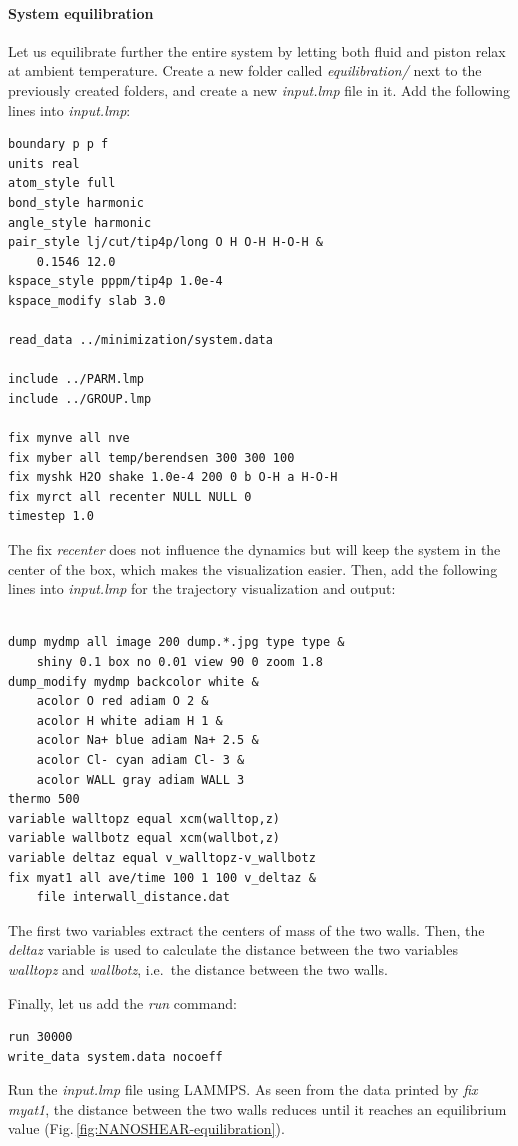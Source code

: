\documentclass[9pt,tutorial]{livecoms}
\begin{document}
\paragraph{System equilibration}
Let us equilibrate further the entire system by letting both fluid and piston
relax at ambient temperature. Create a new folder called \textit{equilibration/}
next to the previously created folders, and create a new \textit{input.lmp}
file in it. Add the following lines into \textit{input.lmp}:
\begin{lstlisting}
boundary p p f
units real
atom_style full
bond_style harmonic
angle_style harmonic
pair_style lj/cut/tip4p/long O H O-H H-O-H &
    0.1546 12.0
kspace_style pppm/tip4p 1.0e-4
kspace_modify slab 3.0

read_data ../minimization/system.data

include ../PARM.lmp
include ../GROUP.lmp

fix mynve all nve
fix myber all temp/berendsen 300 300 100
fix myshk H2O shake 1.0e-4 200 0 b O-H a H-O-H
fix myrct all recenter NULL NULL 0
timestep 1.0
\end{lstlisting}
The fix \textit{recenter} does not influence the dynamics but will keep the
system in the center of the box, which makes the
visualization easier. Then, add the following lines into \textit{input.lmp}
for the trajectory visualization and output:
\begin{lstlisting}

dump mydmp all image 200 dump.*.jpg type type &
    shiny 0.1 box no 0.01 view 90 0 zoom 1.8
dump_modify mydmp backcolor white &
    acolor O red adiam O 2 &
    acolor H white adiam H 1 &
    acolor Na+ blue adiam Na+ 2.5 &
    acolor Cl- cyan adiam Cl- 3 &
    acolor WALL gray adiam WALL 3
thermo 500
variable walltopz equal xcm(walltop,z)
variable wallbotz equal xcm(wallbot,z)
variable deltaz equal v_walltopz-v_wallbotz
fix myat1 all ave/time 100 1 100 v_deltaz &
    file interwall_distance.dat
\end{lstlisting}
The first two variables extract the centers of mass of the two walls. Then,
the \textit{deltaz} variable is used to calculate the distance between the two
variables \textit{walltopz} and \textit{wallbotz}, i.e.~the distance between the two walls.

Finally, let us add the \textit{run} command:
\begin{lstlisting}
run 30000
write_data system.data nocoeff
\end{lstlisting}
Run the \textit{input.lmp} file using LAMMPS. As seen from the data printed by
\textit{fix myat1}, the distance between the two walls reduces until it reaches
an equilibrium value (Fig.\,\ref{fig:NANOSHEAR-equilibration}).
\end{document}
